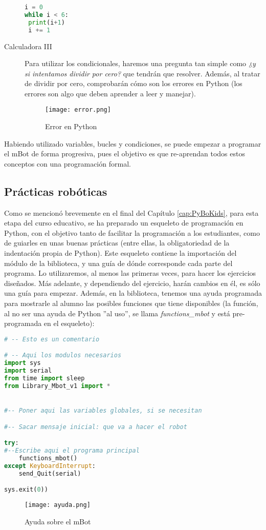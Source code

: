 \begin{description}
\begin{lstlisting}[language=python]
i = 0
while i < 6:
 print(i+1)
 i += 1
\end{lstlisting}
\item [Calculadora III] Para utilizar los condicionales, haremos una pregunta tan simple como \textit{¿y si intentamos dividir por cero?} que tendrán que resolver. Además, al tratar de dividir por cero, comprobarán cómo son los errores en Python (los errores son algo que deben aprender a leer y manejar).
\begin{figure}[H]
	\texttt{[image: error.png]}
	\centering
	\label{img:error}
	\caption{Error en Python}
\end{figure}
\end{description}

Habiendo utilizado variables, bucles y condiciones, se puede empezar a programar el mBot de forma progresiva, pues el objetivo es que re-aprendan todos estos conceptos con una programación formal.
\subsection{Prácticas robóticas}
Como se mencionó brevemente en el final del Capítulo \ref{cap:PyBoKids}, para esta etapa del curso educativo, se ha preparado un esqueleto de programación en Python, con el objetivo tanto de facilitar la programación a los estudiantes, como de guiarles en unas buenas prácticas (entre ellas, la obligatoriedad de la indentación propia de Python). Este esqueleto contiene la importación del módulo de la biblioteca, y una guía de dónde corresponde cada parte del programa. Lo utilizaremos, al menos las primeras veces, para hacer los ejercicios diseñados. Más adelante, y dependiendo del ejercicio, harán cambios en él, es sólo una guía para empezar. Además, en la biblioteca, tenemos una ayuda programada para mostrarle al alumno las posibles funciones que tiene disponibles (la función, al no ser una ayuda de Python ''al uso'', se llama \textit{functions\_mbot} y está pre-programada en el esqueleto):

\begin{lstlisting}[language=python,tabsize=2]
# -- Esto es un comentario

# -- Aqui los modulos necesarios
import sys
import serial
from time import sleep
from Library_Mbot_v1 import *


#-- Poner aqui las variables globales, si se necesitan

#-- Sacar mensaje inicial: que va a hacer el robot

try:
#--Escribe aqui el programa principal
	functions_mbot()
except KeyboardInterrupt:
	send_Quit(serial)

sys.exit(0))
\end{lstlisting}
\begin{figure}[H]
	\texttt{[image: ayuda.png]}
	\centering
	\label{img:ayuda}
	\caption{Ayuda sobre el mBot}
\end{figure}

